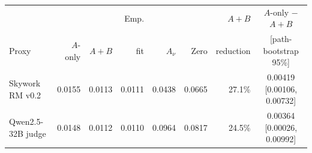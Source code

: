 \begin{tabular}{lrrrrrrc}
\toprule
 &  &  & Emp. &  &  & $A{+}B$ & $A$-only $-$ $A{+}B$ \\
Proxy & $A$-only & $A{+}B$ & fit & $A_\nu$ & Zero & reduction & [path-bootstrap 95\%] \\
\midrule
Skywork RM v0.2 & 0.0155 & 0.0113 & 0.0111 & 0.0438 & 0.0665 & 27.1\% & 0.00419 [0.00106, 0.00732] \\
Qwen2.5-32B judge & 0.0148 & 0.0112 & 0.0110 & 0.0964 & 0.0817 & 24.5\% & 0.00364 [0.00026, 0.00992] \\
\bottomrule
\end{tabular}
